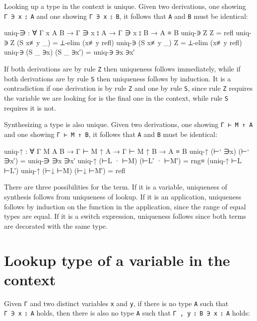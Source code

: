Looking up a type in the context is unique. Given two derivations, one
showing \texttt{Γ\ ∋\ x\ ⦂\ A} and one showing \texttt{Γ\ ∋\ x\ ⦂\ B},
it follows that \texttt{A} and \texttt{B} must be identical:

\begin{fence}
\begin{code}
uniq-∋ : ∀ {Γ x A B} → Γ ∋ x ⦂ A → Γ ∋ x ⦂ B → A ≡ B
uniq-∋ Z Z                 =  refl
uniq-∋ Z (S x≢y _)         =  ⊥-elim (x≢y refl)
uniq-∋ (S x≢y _) Z         =  ⊥-elim (x≢y refl)
uniq-∋ (S _ ∋x) (S _ ∋x′)  =  uniq-∋ ∋x ∋x′
\end{code}
\end{fence}

If both derivations are by rule \texttt{Z} then uniqueness follows
immediately, while if both derivations are by rule \texttt{S} then
uniqueness follows by induction. It is a contradiction if one derivation
is by rule \texttt{Z} and one by rule \texttt{S}, since rule \texttt{Z}
requires the variable we are looking for is the final one in the
context, while rule \texttt{S} requires it is not.

Synthesizing a type is also unique. Given two derivations, one showing
\texttt{Γ\ ⊢\ M\ ↑\ A} and one showing \texttt{Γ\ ⊢\ M\ ↑\ B}, it
follows that \texttt{A} and \texttt{B} must be identical:

\begin{fence}
\begin{code}
uniq-↑ : ∀ {Γ M A B} → Γ ⊢ M ↑ A → Γ ⊢ M ↑ B → A ≡ B
uniq-↑ (⊢` ∋x) (⊢` ∋x′)       =  uniq-∋ ∋x ∋x′
uniq-↑ (⊢L · ⊢M) (⊢L′ · ⊢M′)  =  rng≡ (uniq-↑ ⊢L ⊢L′)
uniq-↑ (⊢↓ ⊢M) (⊢↓ ⊢M′)       =  refl
\end{code}
\end{fence}

There are three possibilities for the term. If it is a variable,
uniqueness of synthesis follows from uniqueness of lookup. If it is an
application, uniqueness follows by induction on the function in the
application, since the range of equal types are equal. If it is a switch
expression, uniqueness follows since both terms are decorated with the
same type.

\hypertarget{lookup-type-of-a-variable-in-the-context}{%
\section{Lookup type of a variable in the
context}\label{lookup-type-of-a-variable-in-the-context}}

Given \texttt{Γ} and two distinct variables \texttt{x} and \texttt{y},
if there is no type \texttt{A} such that \texttt{Γ\ ∋\ x\ ⦂\ A} holds,
then there is also no type \texttt{A} such that
\texttt{Γ\ ,\ y\ ⦂\ B\ ∋\ x\ ⦂\ A} holds:

